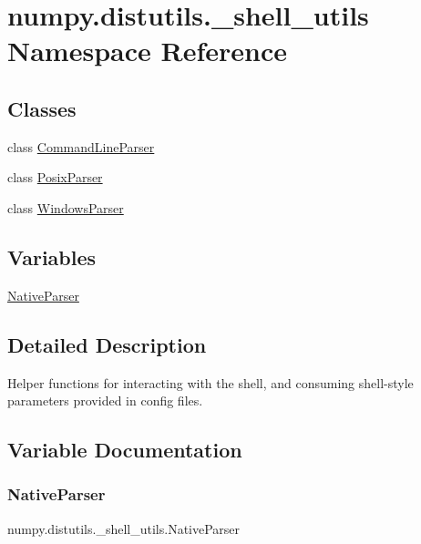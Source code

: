 \hypertarget{namespacenumpy_1_1distutils_1_1__shell__utils}{}\section{numpy.\+distutils.\+\_\+shell\+\_\+utils Namespace Reference}
\label{namespacenumpy_1_1distutils_1_1__shell__utils}
\subsection*{Classes}
\begin{DoxyCompactItemize}
\item 
class \hyperlink{classnumpy_1_1distutils_1_1__shell__utils_1_1CommandLineParser}{Command\+Line\+Parser}
\item 
class \hyperlink{classnumpy_1_1distutils_1_1__shell__utils_1_1PosixParser}{Posix\+Parser}
\item 
class \hyperlink{classnumpy_1_1distutils_1_1__shell__utils_1_1WindowsParser}{Windows\+Parser}
\end{DoxyCompactItemize}
\subsection*{Variables}
\begin{DoxyCompactItemize}
\item 
\hyperlink{namespacenumpy_1_1distutils_1_1__shell__utils_a9cec42eb4299c0efa7aa9c2431752649}{Native\+Parser}
\end{DoxyCompactItemize}


\subsection{Detailed Description}
\begin{DoxyVerb}Helper functions for interacting with the shell, and consuming shell-style
parameters provided in config files.
\end{DoxyVerb}
 

\subsection{Variable Documentation}
\mbox{\label{namespacenumpy_1_1distutils_1_1__shell__utils_a9cec42eb4299c0efa7aa9c2431752649}} 
\subsubsection{\texorpdfstring{Native\+Parser}{NativeParser}}
{\footnotesize\ttfamily numpy.\+distutils.\+\_\+shell\+\_\+utils.\+Native\+Parser}


